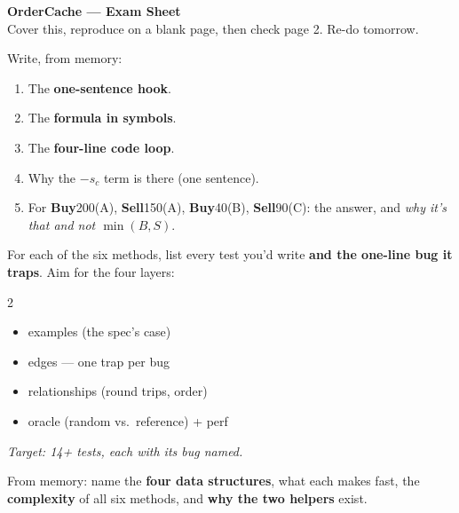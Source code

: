 \documentclass[10pt]{article}
\newcommand{\Buy}{\textcolor{Buy}{\textbf{Buy}}}
\newcommand{\Sell}{\textcolor{Sell}{\textbf{Sell}}}
\begin{document}
\begin{center}
{\LARGE\bfseries\color{NavyBlue} OrderCache --- Exam Sheet}\\[2pt]
{\small Cover this, reproduce on a blank page, then check page 2. Re-do tomorrow.}
\end{center}
\vspace{2mm}

\begin{tcolorbox}[colback=Soft,colframe=Accent,title={\bfseries Drill A --- the matching formula},fonttitle=\bfseries\color{white},coltitle=white,colbacktitle=Accent]
Write, from memory:
\begin{enumerate}[leftmargin=1.5em,nosep]
  \item The \textbf{one-sentence hook}.
  \item The \textbf{formula in symbols}.
  \item The \textbf{four-line code loop}.
  \item Why the \textbf{$-s_c$} term is there (one sentence).
  \item For \Buy{}200(A), \Sell{}150(A), \Buy{}40(B), \Sell{}90(C): the answer, and \emph{why it's that and not $\min(B,S)$}.
\end{enumerate}
\end{tcolorbox}

\vspace{2mm}
\begin{tcolorbox}[colback=Soft,colframe=Sell,title={\bfseries Drill B --- the test suite},fonttitle=\bfseries\color{white},coltitle=white,colbacktitle=Sell]
For each of the six methods, list every test you'd write \textbf{and the one-line bug it traps}. Aim for the four layers:
\begin{multicols}{2}
\begin{itemize}[leftmargin=1.3em,nosep]
  \item[1.] examples (the spec's case)
  \item[2.] edges --- one trap per bug
  \item[3.] relationships (round trips, order)
  \item[4.] oracle (random vs.\ reference) + perf
\end{itemize}
\end{multicols}
\emph{Target: 14+ tests, each with its bug named.}
\end{tcolorbox}

\vspace{2mm}
\begin{tcolorbox}[colback=Soft,colframe=NavyBlue,title={\bfseries Drill C --- the design (say it in 30s)},fonttitle=\bfseries\color{white},coltitle=white,colbacktitle=NavyBlue]
From memory: name the \textbf{four data structures}, what each makes fast, the \textbf{complexity} of all six methods, and \textbf{why the two helpers} exist.
\end{tcolorbox}
\end{document}
